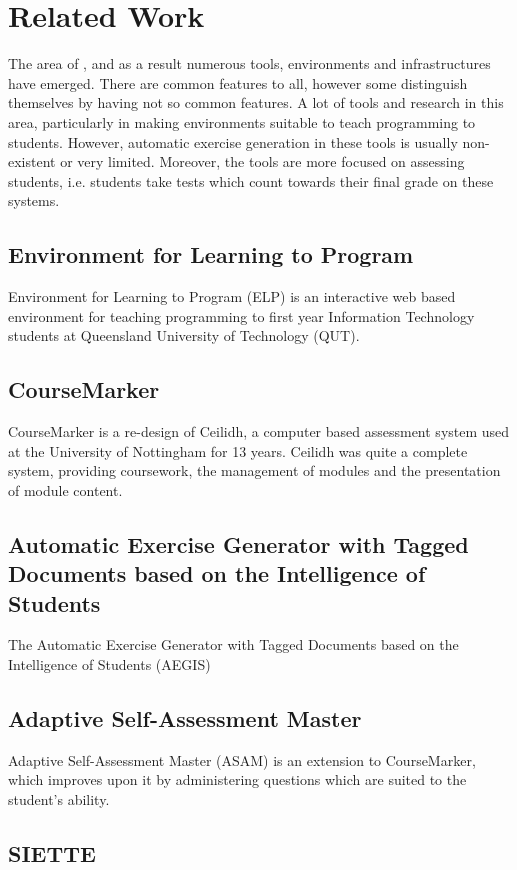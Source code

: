 \documentclass[11pt,a4paper]{report}
\begin{document}
\section{Related Work}
The area of , and as a result numerous tools, environments and infrastructures have emerged. There are common features to all, however some distinguish themselves by having not so common features.
A lot of tools and research in this area, particularly in making environments suitable to teach programming to students. However, automatic exercise generation in these tools is usually non-existent or very limited. Moreover, the tools are more focused on assessing students, i.e. students take tests which count towards their final grade on these systems.

\subsection{Environment for Learning to Program}
Environment for Learning to Program (ELP) is an interactive web based environment for teaching programming to first year Information Technology students at Queensland University of Technology (QUT).

\subsection{CourseMarker}
CourseMarker is a re-design of Ceilidh, a computer based assessment system used at the University of Nottingham for 13 years. Ceilidh was quite a complete system, providing coursework, the management of modules and the presentation of module content.

\subsection{Automatic Exercise Generator with Tagged Documents based on the Intelligence of Students}
The Automatic Exercise Generator with Tagged Documents based on the Intelligence of Students (AEGIS)

\subsection{Adaptive Self-Assessment Master}
Adaptive Self-Assessment Master (ASAM) is an extension to CourseMarker, which improves upon it by administering questions which are suited to the student's ability.

\subsection{SIETTE}
\end{document}
